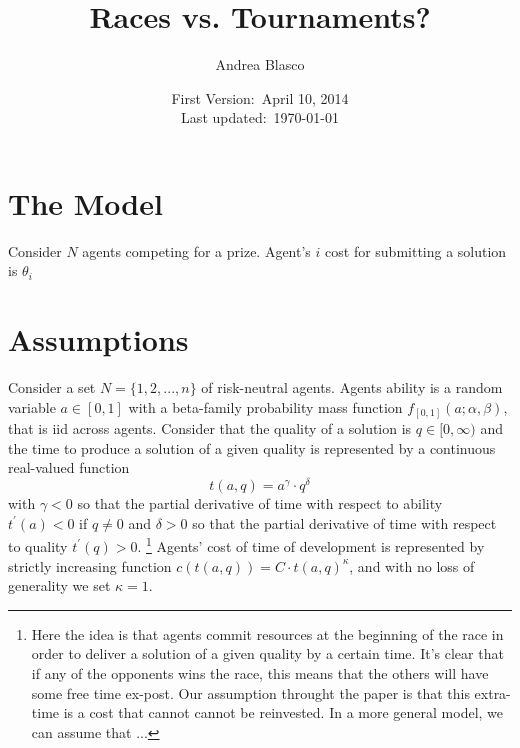 \documentclass[serif]{amsart}
\title{Races vs. Tournaments?}
\date{First Version:~April 10, 2014\\
    Last updated:~\today}
\author{Andrea Blasco}
\begin{document}
 
\maketitle 

\section{The Model}
Consider $N$ agents competing for a prize. Agent's $i$ cost for submitting a solution is $\theta_i$ 


\section{Assumptions}
Consider a set $N =\{ 1,2,..., n\}$ of risk-neutral agents.  Agents ability is a random variable $a\in[0,1]$ with a beta-family probability mass function  $f_{[0,1]}(a;\alpha,\beta)$, that is iid across agents.
Consider that the quality of a solution is $q \in [0,\infty)$ and the time to produce a  solution of a given quality is represented by a continuous real-valued function
\[
	t(a,q) = a^{\gamma} \cdot q^{\delta}  
\]
with $\gamma<0$ so that the partial derivative of time with respect to ability $t^{\prime}(a)<0$ if $q\neq 0$ and $\delta>0$ so that the partial derivative of time with respect to quality $t^{\prime}(q)>0$. 
\footnote{Here the idea is that agents commit resources at the beginning of the race in order to deliver a solution of a given quality by a certain time. It's clear that if any of the opponents wins the race, this means that the others will have some free time ex-post. Our assumption throught the paper is that this extra-time is a cost that cannot  cannot be reinvested. 
In a more general model, we can assume that ...   }
Agents' cost of time of development is represented by strictly increasing function $c(t(a,q)) =  C \cdot t(a,q)^{\kappa}$, and with no loss of generality we set $\kappa=1$.



\end{document}
